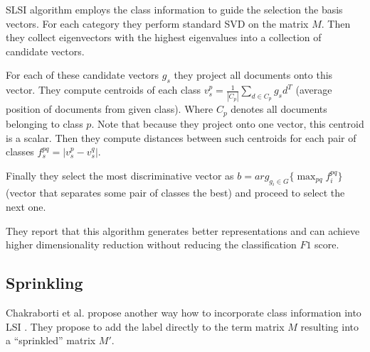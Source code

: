         SLSI algorithm employs the class information to guide the selection the basis vectors. 
        For each category they perform standard SVD on the matrix $M$.
        Then they collect eigenvectors with the highest eigenvalues into a collection of candidate vectors.
        
        For each of these candidate vectors $g_s$ they project all documents onto this vector.
        They compute centroids of each class $v_s^p = \frac{1}{|C_p|}\sum_{d\in C_p} g_s d^T$ (average position of documents from given class). 
        Where $C_p$ denotes all documents belonging to class $p$.
        Note that because they project onto one vector, this centroid is a scalar. 
        Then they compute distances between such centroids for each pair of classes $f_s^{pq} = |v_s^p - v_s^q|$.
        
        Finally they select the most discriminative vector as $b=arg_{g_i \in G} \{\max_{p q} f_i^{p q} \}$ (vector that separates some pair of classes the best) and proceed to select the next one.
        
        They report that this algorithm generates better representations and can achieve higher dimensionality reduction without reducing the classification $F1$ score.
        
        \* %
        
    \subsection{Sprinkling}
        Chakraborti et al. propose another way how to incorporate class information into LSI \cite{chakraborti2006sprinkling}\cite{chakraborti2007supervised}.
        They propose to add the label directly to the term matrix $M$ resulting into a ``sprinkled'' matrix $M'$.

